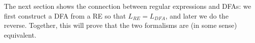 %  
%  
%  
%  
%  
%  
%  
%  
%  
%  
%  
%  


The next section shows the connection between regular expressions and
DFAs: we first construct a DFA from a RE so that $L_{RE} = L_{DFA}$,
and later we do the reverse. Together, this will prove that the two
formalisms are (in some sense) equivalent.


